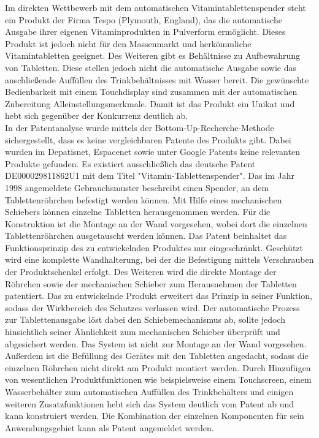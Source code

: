 Im direkten Wettbewerb mit dem automatischen Vitamintablettenspender steht ein Produkt der Firma Tespo (Plymouth, England), das die automatische Ausgabe ihrer eigenen Vitaminprodukten in Pulverform ermöglicht. Dieses Produkt ist jedoch nicht für den Massenmarkt und herkömmliche Vitamintabletten geeignet. Des Weiteren gibt es Behältnisse zu Aufbewahrung von Tabletten. Diese stellen jedoch nicht die automatische Ausgabe sowie das anschließende Auffüllen des Trinkbehältnisses mit Wasser bereit. Die gewünschte Bedienbarkeit mit einem Touchdisplay sind zusammen mit der automatischen Zubereitung Alleinstellungsmerkmale. Damit ist das Produkt ein Unikat und hebt sich gegenüber der Konkurrenz deutlich ab.\\
In der Patentanalyse wurde mittels der Bottom-Up-Recherche-Methode sichergestellt, dass es keine vergleichbaren Patente des Produkts gibt. Dabei wurden im Depatisnet, Espacenet sowie unter Google Patents keine relevanten Produkte gefunden. Es existiert ausschließlich das deutsche Patent DE000029811862U1 mit dem Titel "Vitamin-Tablettenspender". Das im Jahr 1998 angemeldete Gebrauchsmuster beschreibt einen Spender, an dem Tablettenröhrchen befestigt werden können. Mit Hilfe eines mechanischen Schiebers können einzelne Tabletten herausgenommen werden. Für die Konstruktion ist die Montage an der Wand vorgesehen, wobei dort die einzelnen Tablettenröhrchen ausgetauscht werden können. Das Patent beinhaltet das Funktionsprinzip des zu entwickelnden Produktes nur eingeschränkt. Geschützt wird eine komplette Wandhalterung, bei der die Befestigung mittels Verschrauben der Produktschenkel erfolgt. Des Weiteren wird die direkte Montage der Röhrchen sowie der mechanischen Schieber zum Herausnehmen der Tabletten patentiert. Das zu entwickelnde Produkt erweitert das Prinzip in seiner Funktion, sodass der Wirkbereich des Schutzes verlassen wird. Der automatische Prozess zur Tablettenausgabe löst dabei den Schiebemechanismus ab, sollte jedoch hinsichtlich seiner Ähnlichkeit zum mechanischen Schieber überprüft und abgesichert werden. Das System ist nicht zur Montage an der Wand vorgesehen. Außerdem ist die Befüllung des Gerätes mit den Tabletten angedacht, sodass die einzelnen Röhrchen nicht direkt am Produkt montiert werden. Durch Hinzufügen von wesentlichen Produktfunktionen wie beispielsweise einem Touchscreen, einem Wasserbehälter zum automatischen Auffüllen des Trinkbehälters und einigen weiteren Zusatzfunktionen hebt sich das System deutlich vom Patent ab und kann konstruiert werden. Die Kombination der einzelnen Komponenten für sein Anwendungsgebiet kann als Patent angemeldet werden.\\



